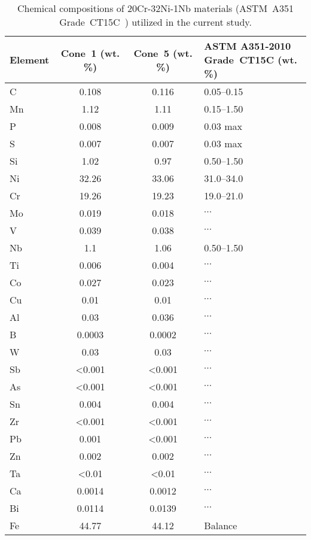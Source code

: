 \begin{table}
\caption{Chemical compositions of 20Cr-32Ni-1Nb materials (ASTM~A351 Grade~CT15C~\cite{astm_a351_2010}) utilized in the current study.}
\begin{tabular}{l c c C{2in}}
\toprule
\textbf{Element} & \textbf{Cone~1 (wt. \%)} & \textbf{Cone~5 (wt. \%)} & \textbf{ASTM A351-2010 \newline Grade~CT15C (wt. \%)}\\
\midrule
C  & 0.108    & 0.116    & 0.05--0.15           \\
Mn & 1.12     & 1.11     & 0.15--1.50           \\
P  & 0.008    & 0.009    & 0.03 max            \\
S  & 0.007    & 0.007    & 0.03 max            \\
Si & 1.02     & 0.97     & 0.50--1.50           \\
Ni & 32.26    & 33.06    & 31.0--34.0           \\
Cr & 19.26    & 19.23    & 19.0--21.0           \\
Mo & 0.019    & 0.018    & $\cdots$                   \\
V  & 0.039    & 0.038    & $\cdots$                   \\
Nb & 1.1      & 1.06     & 0.50--1.50                  \\
Ti & 0.006    & 0.004    & $\cdots$                   \\
Co & 0.027    & 0.023    & $\cdots$           \\
Cu & 0.01     & 0.01     & $\cdots$                   \\
Al & 0.03     & 0.036    & $\cdots$                   \\
B  & 0.0003   & 0.0002   & $\cdots$                   \\
W  & 0.03     & 0.03     & $\cdots$                   \\
Sb & <0.001   & <0.001   & $\cdots$                   \\
As & <0.001   & <0.001   & $\cdots$                   \\
Sn & 0.004    & 0.004    & $\cdots$                   \\
Zr & <0.001   & <0.001   & $\cdots$                   \\
Pb & 0.001    & <0.001   & $\cdots$                   \\
Zn & 0.002    & 0.002    & $\cdots$                   \\
Ta & <0.01    & <0.01    & $\cdots$                   \\
Ca & 0.0014   & 0.0012   & $\cdots$                   \\
Bi & 0.0114   & 0.0139   & $\cdots$                   \\
Fe & 44.77    & 44.12    & Balance             \\
\bottomrule
\end{tabular}
\label{tab:ct15c-chemistry}
\end{table}